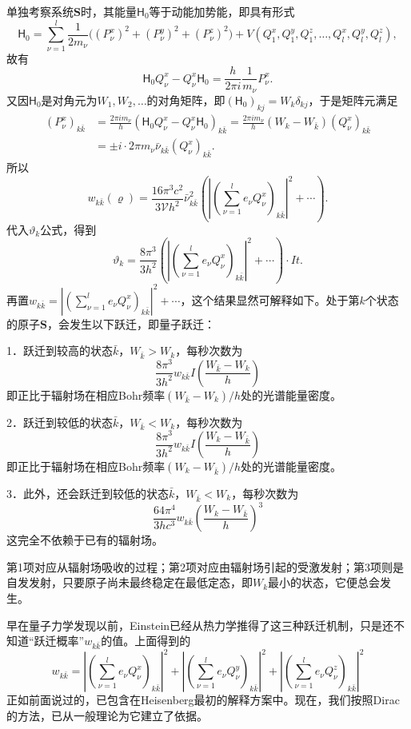 \documentclass[fontsize=13pt,twoside,openany,headings=normal,parskip=false,bookmarkpackage=false,DIV=calc]{scrbook}
\begin{document}
\hypertarget{origpage-156}{}\label{origpage-156}单独考察系统$\boldsymbol{S}$时，其能量$\mathsf{H}_0$等于动能加势能，即具有形式
\[
 \mathsf{H}_0=\sum_{\nu=1}^{l}\frac1{2m_\nu}\bigl((P_\nu^x)^2+(P_\nu^y)^2+(P_\nu^z)^2\bigr)
 +V(Q_1^x,Q_1^y,Q_1^z,\ldots,Q_l^x,Q_l^y,Q_l^z),
\]
故有
\[
 \mathsf{H}_0Q_\nu^x-Q_\nu^x\mathsf{H}_0=\frac h{2\pi i}\frac1{m_\nu}P_\nu^x.
\]
又因$\mathsf{H}_0$是对角元为$W_1,\allowbreak W_2,\allowbreak \ldots$的对角矩阵，即$(\mathsf{H}_0)_{kj}=W_k\delta_{kj}$，于是矩阵元满足
\begin{align*}
 (P_\nu^x)_{k\bar k}
 &=\frac{2\pi i m_\nu}{h}(\mathsf{H}_0Q_\nu^x-Q_\nu^x\mathsf{H}_0)_{k\bar k}
 =\frac{2\pi i m_\nu}{h}(W_k-W_{\bar k})(Q_\nu^x)_{k\bar k}\\
 &=\pm i\cdot2\pi m_\nu\bar\nu_{k\bar k}(Q_\nu^x)_{k\bar k}.
\end{align*}
所以
\[
 w_{k\bar k}(\varrho)=\frac{16\pi^3c^2}{3\mathcal Vh^2}\bar\nu_{k\bar k}^{2}
 \left(\left|\left(\sum_{\nu=1}^{l}e_\nu Q_\nu^x\right)_{k\bar k}\right|^2+\cdots\right).
\]
代入$\vartheta_k$公式，得到
\[
 \vartheta_k=\frac{8\pi^3}{3h^2}
 \left(\left|\left(\sum_{\nu=1}^{l}e_\nu Q_\nu^x\right)_{k\bar k}\right|^2+\cdots\right)\cdot It.
\]
再置$w_{k\bar k}=\left|\left(\sum_{\nu=1}^{l}e_\nu Q_\nu^x\right)_{k\bar k}\right|^2+\cdots$，这个结果显然可解释如下。处于第$k$个状态的原子$\boldsymbol{S}$，会发生以下跃迁，即量子跃迁：

1．跃迁到较高的状态$\bar k$，$W_{\bar k}>W_k$，每秒次数为
\[
 \frac{8\pi^3}{3h^2}w_{k\bar k}I\left(\frac{W_{\bar k}-W_k}{h}\right)
 \]
即正比于辐射场在相应Bohr频率$(W_{\bar k}-W_k)/h$处的光谱能量密度。

2．跃迁到较低的状态$\bar k$，$W_{\bar k}<W_k$，每秒次数为
\[
 \frac{8\pi^3}{3h^2}w_{k\bar k}I\left(\frac{W_k-W_{\bar k}}{h}\right)
 \]
即正比于辐射场在相应Bohr频率$(W_k-W_{\bar k})/h$处的光谱能量密度。

3．此外，还会跃迁到较低的状态$\bar k$，$W_{\bar k}<W_k$，每秒次数为
\[
 \frac{64\pi^4}{3hc^3}w_{k\bar k}\left(\frac{W_k-W_{\bar k}}{h}\right)^3
 \]
这完全不依赖于已有的辐射场。

第1项对应从辐射场吸收的过程；第2项对应由辐射场引起的受激发射；第3项则是自发发射，只要原子尚未最终稳定在最低定态，即$W_k$最小的状态，它便总会发生。

\hypertarget{origpage-157}{}\label{origpage-157}早在量子力学发现以前，Einstein已经从热力学推得了这三种跃迁机制，只是还不知道“跃迁概率”$w_{k\bar k}$的值。上面得到的
\[
 w_{k\bar k}=\left|\left(\sum_{\nu=1}^{l}e_\nu Q_\nu^x\right)_{k\bar k}\right|^2
 +\left|\left(\sum_{\nu=1}^{l}e_\nu Q_\nu^y\right)_{k\bar k}\right|^2
 +\left|\left(\sum_{\nu=1}^{l}e_\nu Q_\nu^z\right)_{k\bar k}\right|^2
\]
正如前面说过的，已包含在Heisenberg最初的解释方案中。现在，我们按照Dirac的方法，已从一般理论为它建立了依据。
\end{document}
